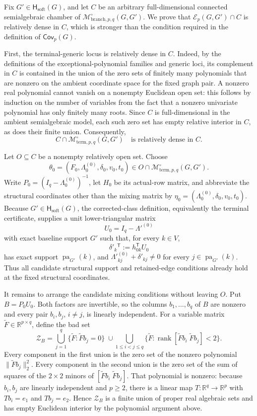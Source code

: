 Fix \(G'\in\mathsf H_{\mathrm{soft}}(G)\), and let \(C\) be an arbitrary full-dimensional connected semialgebraic chamber of \(\mathcal M^{\circ}_{\mathrm{branch},p,q}(G,G')\).  We prove that \(\mathcal E_p(G,G')\cap C\) is relatively dense in \(C\), which is stronger than the condition required in the definition of \(\mathsf{Cov}_p(G)\).

First, the terminal-generic locus is relatively dense in \(C\).  Indeed, by the definitions of the exceptional-polynomial families and generic loci, its complement in \(C\) is contained in the union of the zero sets of finitely many polynomials that are nonzero on the ambient coordinate space for the fixed graph pair.  A nonzero real polynomial cannot vanish on a nonempty Euclidean open set: this follows by induction on the number of variables from the fact that a nonzero univariate polynomial has only finitely many roots.  Since \(C\) is full-dimensional in the ambient semialgebraic model, each such zero set has empty relative interior in \(C\), as does their finite union.  Consequently,
\[
 C\cap\mathcal M^{\circ}_{\mathrm{term},p,q}(G,G')
 \quad\text{is relatively dense in }C.
\]

Let \(O\subseteq C\) be a nonempty relatively open set.  Choose
\[
 \theta_0=(F_0,\Lambda^{(0)}_0,\delta_0,v_0,t_0)
 \in O\cap\mathcal M^{\circ}_{\mathrm{term},p,q}(G,G').
\]
Write \(P_0=(I_q-\Lambda^{(0)}_0)^{-1}\), let \(H_0\) be its actual-row matrix, and abbreviate the structural coordinates other than the mixing matrix by
\(
 \eta_0=(\Lambda^{(0)}_0,\delta_0,v_0,t_0).
\)
Because \(G'\in\mathsf H_{\mathrm{soft}}(G)\), the corrected-class definition, equivalently the terminal certificate, supplies a unit lower-triangular matrix
\[
 U_0=I_q-\Lambda'^{(0)}
\]
with exact baseline support \(G'\) such that, for every \(k\in V\),
\[
 \delta'_k{}^{\mathsf T}:=h_{0k}^{\mathsf T}U_0
\]
has exact support \(\operatorname{pa}_{G'}(k)\), and
\(
 \Lambda'^{(0)}_{kj}+\delta'_{kj}\ne0
\)
for every \(j\in\operatorname{pa}_{G'}(k)\).  Thus all candidate structural support and retained-edge conditions already hold at the fixed structural coordinates.

It remains to arrange the candidate mixing conditions without leaving \(O\).  Put \(B=P_0U_0\).  Both factors are invertible, so the columns \(b_1,\ldots,b_q\) of \(B\) are nonzero and every pair \(b_i,b_j\), \(i\ne j\), is linearly independent.  For a variable matrix \(\widetilde F\in\mathbb R^{p\times q}\), define the bad set
\[
 \mathcal Z_B=
 \bigcup_{j=1}^q\{\widetilde F:\widetilde F b_j=0\}
 \;\cup\!
 \bigcup_{1\le i<j\le q}
 \{\widetilde F:\operatorname{rank}[\widetilde F b_i\;\widetilde F b_j]<2\}.
\]
Every component in the first union is the zero set of the nonzero polynomial
\(
 \|\widetilde F b_j\|_2^2.
\)
Every component in the second union is the zero set of the sum of squares of the \(2\times2\) minors of
\([
\widetilde F b_i\;\widetilde F b_j
]\).  That polynomial is nonzero: because \(b_i,b_j\) are linearly independent and \(p\ge2\), there is a linear map \(T:\mathbb R^q\to\mathbb R^p\) with \(Tb_i=e_1\) and \(Tb_j=e_2\).  Hence \(\mathcal Z_B\) is a finite union of proper real algebraic sets and has empty Euclidean interior by the polynomial argument above.

